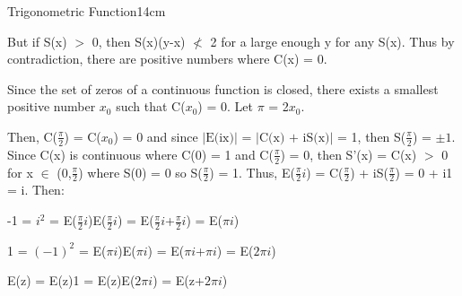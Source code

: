 \begin{definition}{Trigonometric Function}{14cm}
\begin{enumerate}[label=(\alph*), leftmargin=1.5cm, itemsep=0.1cm]
                But if S(x) $>$ 0, then S(x)(y-x) $\not <$ 2 for a large enough
                y for any S(x).
                Thus by contradiction, there are positive numbers where C(x) = 0.
                
                \vspace{0.2cm}

                Since the set of zeros of a continuous function is closed,
                there exists a smallest positive number $x_0$ such that C($x_0$) = 0.
                Let $\pi$ = 2$x_0$.

                Then, C($\frac{\pi}{2}$) = C($x_0$) = 0
                and since $|\text{E(ix)}|$
                = $|\text{C(x) + iS(x)}|$ = 1,
                then S($\frac{\pi}{2}$) = $\pm 1$.
                Since C(x) is continuous where C(0) = 1 and C($\frac{\pi}{2}$) = 0,
                then S'(x) = C(x) $>$ 0 for x $\in$ (0,$\frac{\pi}{2}$)
                where S(0) = 0 so S($\frac{\pi}{2}$) = 1.
                Thus, E($\frac{\pi}{2}i$) = C($\frac{\pi}{2}$) + iS($\frac{\pi}{2}$)
                = 0 + i1 = i. Then:

                \hspace{0.5cm}
                -1 = $i^2$ = E($\frac{\pi}{2}i$)E($\frac{\pi}{2}i$)
                = E($\frac{\pi}{2}i$+$\frac{\pi}{2}i$) = E($\pi i$)

                \hspace{0.5cm}
                1 = $(-1)^2$ = E($\pi i$)E($\pi i$)
                = E($\pi i$+$\pi i$) = E($2\pi i$)

                \hspace{0.5cm}
                E(z) = E(z)1 = E(z)E($2\pi i$) = E(z+$2\pi i$)
        \end{enumerate}
    \end{definition}

    \vspace{0.5cm}



